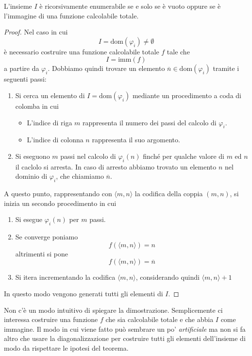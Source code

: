 \begin{theorem}
	L'insieme $I$ è ricorsivamente enumerabile se e solo se è
	vuoto oppure se è l'immagine di una funzione calcolabile
	totale.
	\begin{proof}
		Nel caso in cui
		\[ I = \text{dom}(\varphi_i) \neq \emptyset \]
		è necessario costruire una funzione calcolabile totale
		$f$ tale che
		\[ I = \text{imm}(f) \]
		a partire da $\varphi_i$. Dobbiamo quindi trovare un
		elemento $\overline{n} \in \text{dom}(\varphi_i)$
		tramite i seguenti passi:
		\begin{enumerate}
			\item Si cerca un elemento di
			      $I = \text{dom}(\varphi_i)$ mediante un
			      procedimento a coda di colomba in cui
			      \begin{itemize}
				      \item L'indice di riga $m$ rappresenta il
				            numero dei passi del calcolo di
				            $\varphi_i$.
				      \item L'indice di colonna $n$ rappresenta
				            il suo argomento.
			      \end{itemize}
			\item Si eseguono $m$ passi nel calcolo di
			      $\varphi_i(n)$ finché per qualche valore di
			      $m$ ed $n$ il caclolo si arresta. In caso di
			      arresto abbiamo trovato un elemento $n$ nel
			      dominio di $\varphi_i$, che chiamiamo
			      $\overline{n}$.
		\end{enumerate}
		A questo punto, rappresentando con $\langle m,n \rangle$
		la codifica della coppia $(m, n)$, si inizia un secondo
		procedimento in cui
		\begin{enumerate}
			\item Si esegue $\varphi_i (n)$ per $m$ passi.
			\item Se converge poniamo
			      \[ f(\langle m,n \rangle) = n \]
			      altrimenti si pone
			      \[ f(\langle m,n \rangle) = \overline{n} \]
			\item Si itera incrementando la codifica
			      $\langle m,n \rangle$, considerando quindi
			      $\langle m,n \rangle + 1$
		\end{enumerate}
		In questo modo vengono generati tutti gli elementi di
		$I$.
	\end{proof}
\end{theorem}

Non c'è un modo intuitivo di spiegare la dimostrazione.
Semplicemente ci interessa costruire una funzione $f$ che sia
calcolabile totale e che abbia $I$ come immagine. Il modo in cui
viene fatto può sembrare un po' \emph{artificiale} ma non si fa
altro che usare la diagonalizzazione per costruire tutti gli
elementi dell'insieme di modo da rispettare le ipotesi del
teorema.

